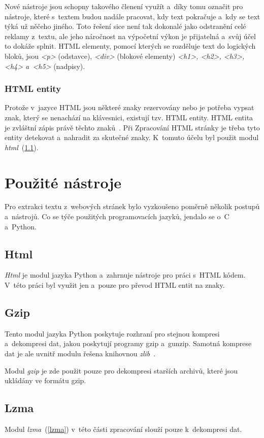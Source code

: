 Nové nástroje jsou schopny takového členení využít a~díky tomu označit pro nástroje,
které s~textem budou nadále pracovat, kdy text pokračuje a~kdy se text týká už něčeho jiného.
Toto řešení sice není tak dokonalé jako odstranění celé reklamy z~textu, ale jeho náročnost na výpočetní
výkon je přijatelná a~svůj účel to dokáže splnit. HTML elementy, pomocí
kterých se rozděluje text do logických bloků, jsou \textit{<p>} (odstavce),
\textit{<div>} (blokové elementy) \textit{<h1>, <h2>, <h3>, <h4> a~<h5>} (nadpisy).

\subsubsection{HTML entity}
Protože v~jazyce HTML jsou některé znaky rezervovány nebo je potřeba vypsat znak, který se nenachází na klávesnici,
existují tzv. HTML entity. HTML entita je zvláštní zápis právě těchto znaků~\cite{HTML_ENTITES}. Při Zpracování
HTML stránky je třeba tyto entity detekovat a~nahradit za skutečné znaky. K~tomuto účelu byl použit modul
\textit{html}~(\ref{html}).

\section{Použité nástroje}
Pro extrakci textu z~webových stránek bylo vyzkoušeno poměrně několik postupů a~nástrojů. Co se týče použitých
programovacích jazyků, jendalo se o~C a~Python.

\subsection{Html}
\label{html}
\textit{Html} je modul jazyka Python a~zahrnuje nástroje pro práci s~HTML kódem. V~této práci byl využit jen a~pouze pro
převod HTML entit na znaky.

\subsection{Gzip}
\label{gzip}
Tento modul jazyka Python poskytuje rozhraní pro stejnou kompresi a~dekompresi dat, jakou poskytují programy gzip a~gunzip.
Samotná komprese dat je ale uvnitř modulu řešena knihovnou \textit{zlib}~\cite{GZIP}.

Modul \textit{gzip} je zde použit pouze pro dekompresi starších archivů, které jsou ukládány ve formátu gzip.

\subsection{Lzma}
Modul \textit{lzma}~(\ref{lzma}) v~této části zpracování slouží pouze k~dekompresi dat.

